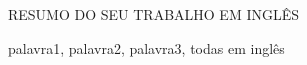 RESUMO DO SEU TRABALHO EM INGLÊS

\begin{keywords}
palavra1, palavra2, palavra3, todas em inglês
\end{keywords}